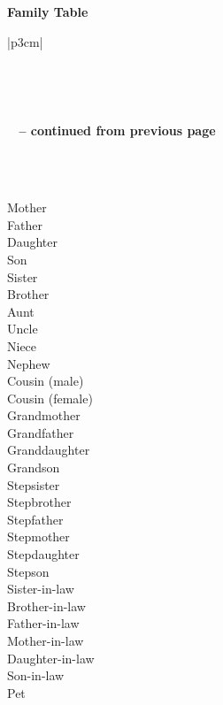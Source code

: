 \textbf{Family Table}
\begin{longtable}{|p{3cm}|}
\caption{Family Table.} \vspace{0.25em} \\ \hline 

\hline {}  \\ \hline 
\endfirsthead

{{\bfseries \tablename\ \thetable{} -- continued from previous page}} \\
\hline {} \\ \hline 
\endhead

\hline {} \\ \hline
\endfoot

\hline \hline
\endlastfoot
Mother \\ \hline
Father \\ \hline
Daughter \\ \hline
Son \\ \hline
Sister \\ \hline
Brother \\ \hline
Aunt \\ \hline
Uncle \\ \hline
Niece \\ \hline
Nephew \\ \hline
Cousin (male) \\ \hline
Cousin (female) \\ \hline
Grandmother \\ \hline
Grandfather \\ \hline
Granddaughter \\ \hline
Grandson \\ \hline
Stepsister \\ \hline
Stepbrother \\ \hline
Stepfather \\ \hline
Stepmother \\ \hline
Stepdaughter \\ \hline
Stepson \\ \hline
Sister-in-law \\ \hline
Brother-in-law \\ \hline
Father-in-law \\ \hline
Mother-in-law \\ \hline
Daughter-in-law \\ \hline
Son-in-law \\ \hline
Pet \\ \hline
\end{longtable}

